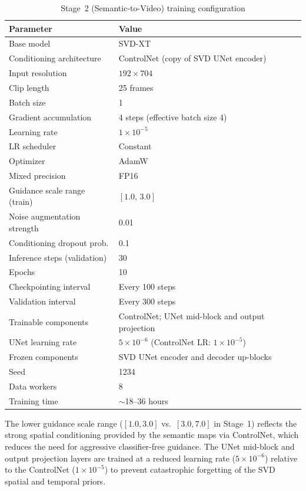 \begin{table}[t]
    \centering
    \caption{Stage~2 (Semantic-to-Video) training configuration}
    \label{tab:stage2_config}
    \begin{tabular}{ll}
        \toprule
        \textbf{Parameter} & \textbf{Value} \\
        \midrule
        Base model & SVD-XT~\cite{blattmann2023stable} \\
        Conditioning architecture & ControlNet (copy of SVD UNet encoder) \\
        Input resolution & $192 \times 704$ \\
        Clip length & 25 frames \\
        Batch size & 1 \\
        Gradient accumulation & 4 steps (effective batch size 4) \\
        Learning rate & $1 \times 10^{-5}$ \\
        LR scheduler & Constant \\
        Optimizer & AdamW~\cite{loshchilov2019decoupled} \\
        Mixed precision & FP16 \\
        Guidance scale range (train) & $[1.0,\, 3.0]$ \\
        Noise augmentation strength & 0.01 \\
        Conditioning dropout prob. & 0.1 \\
        Inference steps (validation) & 30 \\
        Epochs & 10 \\
        Checkpointing interval & Every 100 steps \\
        Validation interval & Every 300 steps \\
        Trainable components & ControlNet; UNet mid-block and output projection \\
        UNet learning rate & $5 \times 10^{-6}$ (ControlNet LR: $1 \times 10^{-5}$) \\
        Frozen components & SVD UNet encoder and decoder up-blocks \\
        Seed & 1234 \\
        Data workers & 8 \\
        Training time & $\sim$18--36 hours \\
        \bottomrule
    \end{tabular}
\end{table}

The lower guidance scale range ($[1.0, 3.0]$ vs.\ $[3.0, 7.0]$ in Stage~1) reflects the strong spatial conditioning provided by the semantic maps via ControlNet, which reduces the need for aggressive classifier-free guidance. The UNet mid-block and output projection layers are trained at a reduced learning rate ($5 \times 10^{-6}$) relative to the ControlNet ($1 \times 10^{-5}$) to prevent catastrophic forgetting of the SVD spatial and temporal priors.


